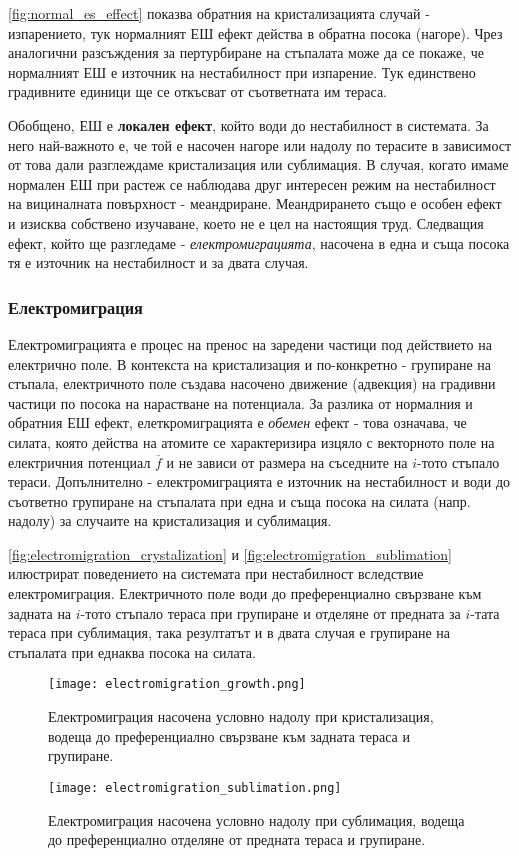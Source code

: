 \autoref{fig:normal_es_effect} показва обратния на кристализацията случай - изпарението, тук нормалният ЕШ ефект действа в обратна посока (нагоре). Чрез аналогични разсъждения за пертурбиране на стъпалата може да се покаже, че нормалният ЕШ е източник на нестабилност при изпарение. Тук единствено градивните единици ще се откъсват от съответната им тераса.

Обобщено, ЕШ е \textbf{локален ефект}, който води до нестабилност в системата. За него най-важното е, че той е насочен нагоре или надолу по терасите в зависимост от това дали разглеждаме кристализация или сублимация.  В случая, когато имаме нормален ЕШ при растеж се наблюдава друг интересен режим на нестабилност на вициналната повърхност - меандриране. Меандрирането също е особен ефект и изисква собствено изучаване, което не е цел на настоящия труд. \cite{Krug2005} Следващия ефект, който ще разгледаме - \textit{електромиграцията}, насочена в една и съща посока тя е източник на нестабилност и за двата случая.

\subsubsection{Електромиграция}
Електромиграцията е процес на пренос на заредени частици под действието на електрично поле. В контекста на кристализация и по-конкретно - групиране на стъпала, електричното поле създава насочено движение (адвекция) на градивни частици по посока на нарастване на потенциала.
За разлика от нормалния и обратния ЕШ ефект, елеткромиграцията е \textit{обемен} ефект - това означава, че силата, която действа на атомите се характеризира изцяло с векторното поле на електричния потенциал $\overline{f}$ и не зависи от размера на съседните на $i$-тото стъпало тераси. Допълнително - електромиграцията е източник на нестабилност и води до съответно групиране на стъпалата при една и съща посока на силата (напр. надолу) за случаите на кристализация и сублимация.

\autoref{fig:electromigration_crystalization} и \autoref{fig:electromigration_sublimation} илюстрират поведението на системата при нестабилност вследствие електромиграция. Електричното поле води до преференциално свързване към задната на $i$-тото стъпало тераса при групиране и отделяне от предната за $i$-тата тераса при сублимация, така резултатът и в двата случая е групиране на стъпалата при еднаква посока на силата.
\begin{figure}[htbp]
	\centering
	\texttt{[image: electromigration\_growth.png]}
	\caption{Електромиграция насочена условно надолу при кристализация, водеща до преференциално свързване към задната тераса и групиране.}
	\label{fig:electromigration_crystalization}
\end{figure}
\begin{figure}[htbp]
	\centering
	\texttt{[image: electromigration\_sublimation.png]}
	\caption{Електромиграция насочена условно надолу при сублимация, водеща до преференциално отделяне от предната тераса и групиране.}
	\label{fig:electromigration_sublimation}
\end{figure}

